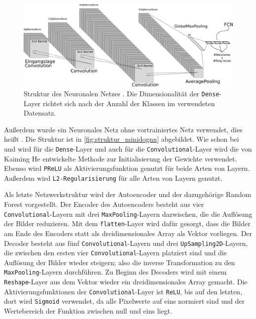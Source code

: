 \begin{figure}
  \centering
  \includegraphics[width=\textwidth]{pics/nn.pdf}
  \caption{Struktur des Neuronalen Netzes \MiniDog{}. Die Dimensionalität
  der \texttt{Dense}-Layer richtet sich nach der Anzahl der Klassen im verwendeten Datensatz.}
  \label{fig:struktur_minidognn}
\end{figure}

Außerdem wurde ein Neuronales Netz ohne vortrainiertes Netz verwendet, dies heißt
\MiniDog{}. Die Struktur ist in \autoref{fig:struktur_minidognn} abgebildet.
Wie schon bei \PreDog{} und \PreBig{} wird für die \texttt{Dense}-Layer und auch
für die \texttt{Convolutional}-Layer wird die von Kaiming He entwickelte Methode
zur Initialisierung der Gewichte verwendet. Ebenso wird \texttt{PReLU} als
Aktivierungsfunktion genutzt für beide Arten von Layern. Außerdem wird
\texttt{L2-Regularisierung} für alle Arten von Layern genutzt.

Als letzte Netzwerkstruktur wird der Autoencoder und der dazugehörige Random
Forest vorgestellt. Der Encoder des Autoencoders besteht aus vier
\texttt{Convolutional}-Layern mit drei \texttt{MaxPooling}-Layern dazwischen,
die die Auflösung der Bilder reduzieren. Mit dem \texttt{flatten}-Layer wird
dafür gesorgt, dass die Bilder am Ende des Encoders statt als dreidimensionales
Array als Vektor vorliegen. Der Decoder besteht aus fünf
\texttt{Convolutional}-Layern und drei \texttt{UpSampling2D}-Layern, die
zwischen den ersten vier \texttt{Convolutional}-Layern platziert sind und die
Auflösung der Bilder wieder steigern; also die inverse Transformation zu den
\texttt{MaxPooling}-Layern durchführen. Zu Beginn des Decoders wird mit einem
\texttt{Reshape}-Layer aus dem Vektor wieder ein dreidimensionales Array
gemacht. Die Aktivierungsfunktionen der \texttt{Convolutional}-Layer ist
\texttt{ReLU}, bis auf den letzten, dort wird \texttt{Sigmoid} verwendet, da
alle Pixelwerte auf eins normiert sind und der Wertebereich der Funktion
zwischen null und eins liegt.

